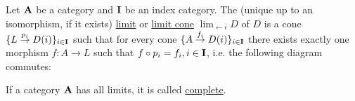 \begin{definition}\label{def:categorical_limit}\cite[definition 5.1.19(b)]{Leinster2014}
  Let $\operatorname{\mathbf{A}}$ be a category and $\operatorname{\mathbf{I}}$ be an index category. The (unique up to an isomorphism, if it exists) \uline{limit} or \uline{limit cone} $\displaystyle\lim_{\leftarrow i} D$ of $D$ is a cone $\{ L \overset {p_i} \to D(i) \}_{i \in \operatorname{\mathbf{I}}}$ such that for every cone $\{ A \overset {f_i} \to D(i) \}_{i \in \operatorname{\mathbf{I}}}$ there exists exactly one morphism $f: A \to L$ such that $f \circ p_i = f_i, i \in \operatorname{\mathbf{I}}$, i.e. the following diagram commutes:
  \begin{center}
  \end{center}
\end{definition}

\begin{definition}\label{def:complete_category}\cite[definition 6.3.6]{Leinster2014}
  If a category $\operatorname{\mathbf{A}}$ has all limits, it is called \uline{complete}.
\end{definition}

